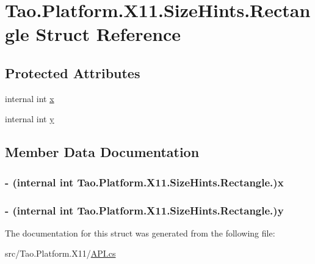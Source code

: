 \hypertarget{struct_tao_1_1_platform_1_1_x11_1_1_size_hints_1_1_rectangle}{
\section{Tao.Platform.X11.SizeHints.Rectangle Struct Reference}
\label{struct_tao_1_1_platform_1_1_x11_1_1_size_hints_1_1_rectangle}
}
\subsection*{Protected Attributes}
\begin{DoxyCompactItemize}
\item 
internal int \hyperlink{struct_tao_1_1_platform_1_1_x11_1_1_size_hints_1_1_rectangle_a95ee193bbb22aeaf2d2bb508e14dd01a}{x}
\item 
internal int \hyperlink{struct_tao_1_1_platform_1_1_x11_1_1_size_hints_1_1_rectangle_a284c538dc90d9c88811bdf3ac17bfe10}{y}
\end{DoxyCompactItemize}


\subsection{Member Data Documentation}
\hypertarget{struct_tao_1_1_platform_1_1_x11_1_1_size_hints_1_1_rectangle_a95ee193bbb22aeaf2d2bb508e14dd01a}{
\subsubsection[{x}]{\setlength{\rightskip}{0pt plus 5cm}-\/ (internal int Tao.Platform.X11.SizeHints.Rectangle.){\bf x}}}
\label{struct_tao_1_1_platform_1_1_x11_1_1_size_hints_1_1_rectangle_a95ee193bbb22aeaf2d2bb508e14dd01a}
\hypertarget{struct_tao_1_1_platform_1_1_x11_1_1_size_hints_1_1_rectangle_a284c538dc90d9c88811bdf3ac17bfe10}{
\subsubsection[{y}]{\setlength{\rightskip}{0pt plus 5cm}-\/ (internal int Tao.Platform.X11.SizeHints.Rectangle.){\bf y}}}
\label{struct_tao_1_1_platform_1_1_x11_1_1_size_hints_1_1_rectangle_a284c538dc90d9c88811bdf3ac17bfe10}


The documentation for this struct was generated from the following file:\begin{DoxyCompactItemize}
\item 
src/Tao.Platform.X11/\hyperlink{_a_p_i_8cs}{API.cs}\end{DoxyCompactItemize}
